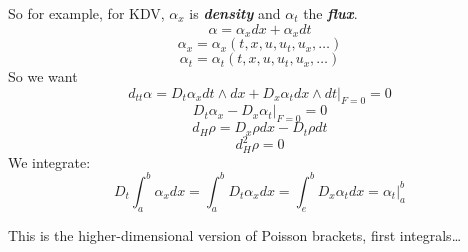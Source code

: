 So for example, for KDV, $\alpha_x$ is \textit{\textbf{density}} and  $\alpha_t$ the \textit{\textbf{flux}}.
 \[\alpha=\alpha_x dx+\alpha_x dt\]
 \[\alpha_x=\alpha_x (t,x,u,u_t,u_x,\ldots)\]
 \[\alpha_t=\alpha_t(t,x,u,u_t,u_x,\ldots)\]
 So we want
 \[d_{t t}\alpha=D_t\alpha_x dt \wedge dx+ D_x \alpha_t dx \wedge dt\Big|_{F=0}=0\]
\[D_t\alpha_x-D_x \alpha_t \Big|_{F=0}=0\]
\[d_H\rho=D_x\rho dx-D_t\rho dt\]
\[d^2_H\rho=0\]
We integrate:
\[D_t \int_{a}^b\alpha_x dx=\int_{a}^b D_t \alpha_x dx=\int_{e}^b D_x \alpha_t dx=\alpha_t|_{a}^b\]



 
\begin{upshot}\leavevmode
	This is the higher-dimensional version of Poisson brackets, first integrals…
\end{upshot} 
 



